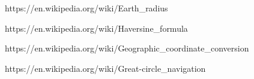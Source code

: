 \documentclass{article}
\begin{document}
\begin{thebibliography}{9}

\begin{verbatim*}
https://en.wikipedia.org/wiki/Earth_radius
\end{verbatim*}
    
\begin{verbatim*}
https://en.wikipedia.org/wiki/Haversine_formula
\end{verbatim*}
        
\begin{verbatim*}
https://en.wikipedia.org/wiki/Geographic_coordinate_conversion
\end{verbatim*}
    
\begin{verbatim*}
https://en.wikipedia.org/wiki/Great-circle_navigation
\end{verbatim*}

\end{thebibliography}
\end{document}

